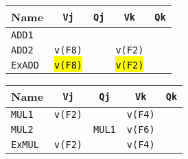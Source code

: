 \begin{enumerate}
    \begin{minipage}[t]{0.43\textwidth}
        \centering
        \begin{adjustbox}{width={\textwidth},totalheight={\textheight},keepaspectratio}
            \begin{tabular}{@{} l | c c c c @{}}
                \toprule
                Name            & \texttt{Vj}           & \texttt{Qj}                       & \texttt{Vk}           & \texttt{Qk}           \\
                \midrule
                \texttt{ADD1}   &                       &                                   &                       &                       \\ [.3em]
                \texttt{ADD2}   & \texttt{v(F8)}        &                                   & \texttt{v(F2)}        &                       \\
                \cmidrule{1-5}
                \texttt{ExADD}  & \hl{\texttt{v(F8)}}   &                                   & \hl{\texttt{v(F2)}}   &                       \\
                \bottomrule
            \end{tabular}
        \end{adjustbox}
    \end{minipage}
    \hfill
    \begin{minipage}[t]{0.43\textwidth}
        \centering
        \begin{adjustbox}{width={\textwidth},totalheight={\textheight},keepaspectratio}
            \begin{tabular}{@{} l | c c c c @{}}
                \toprule
                Name            & \texttt{Vj}           & \texttt{Qj}           & \texttt{Vk}           & \texttt{Qk}   \\
                \midrule
                \texttt{MUL1}   & \texttt{v(F2)}        &                       & \texttt{v(F4)}        &               \\ [.3em]
                \texttt{MUL2}   &                       & \texttt{MUL1}         & \texttt{v(F6)}        &               \\
                \cmidrule{1-5}
                \texttt{ExMUL}  & \texttt{v(F2)}        &                       & \texttt{v(F4)}        &               \\
                \bottomrule
            \end{tabular}
        \end{adjustbox}
    \end{minipage}


\end{enumerate}
